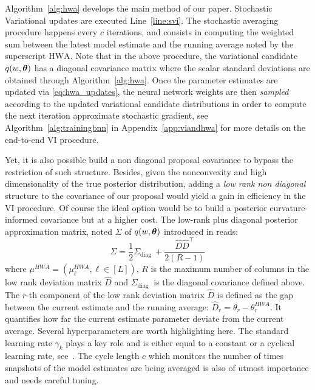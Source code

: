\documentclass[tablecaption=bottom,wcp]{jmlr} %
\begin{document}
Algorithm~\ref{alg:hwa} develops the main method of our paper.
Stochastic Variational updates are executed Line~\ref{line:svi}.
The stochastic averaging procedure happens every $c$ iterations, and consists in computing the weighted sum between the latest model estimate and the running average noted by the superscript $\textrm{HWA}$.
Note that in the above procedure, the variational candidate $q(w, \param)$ has a diagonal covariance matrix where the scalar standard deviations are obtained through Algorithm~\ref{alg:hwa}.
Once the parameter estimates are updated via \eqref{eq:hwa_updates}, the neural network weights are then \emph{sampled} according to the updated variational candidate distributions in order to compute the next iteration approximate stochastic gradient, see Algorithm~\ref{alg:trainingbnn} in Appendix~\ref{app:viandhwa} for more details on the end-to-end VI procedure.

Yet, it is also possible build a non diagonal proposal covariance to bypass the restriction of such structure.
Besides, given the nonconvexity and high dimensionality of the true posterior distribution, adding a \emph{low rank non diagonal} structure to the covariance of our proposal would yield a gain in efficiency in the VI procedure.
Of course the ideal option would be to build a posterior curvature-informed covariance but at a higher cost.
The low-rank plus diagonal posterior approximation matrix, noted $\Sigma$ of $q(w, \param)$ introduced in \citep{maddox2019simple} reads:
\begin{equation}\label{eq:lowrankcov}
\Sigma = \frac{1}{2} \Sigma_{\text {diag }}+\frac{\widehat{D} \widehat{D}^{\top}}{2(R-1)}
\end{equation}
where $\mu^{HWA} = (\mu_{\ell}^{HWA}, \ell \in [L])$, $R$ is the maximum number of columns in the low rank deviation matrix $\widehat{D}$ and $\Sigma_{\text {diag }}$ is the diagonal covariance defined above. 
The $r$-th component of the  low rank deviation matrix $\widehat{D}$ is defined as the gap between the current estimate and the running average: $\widehat{D}_r = \theta_r - \theta^{HWA}_r$. 
It quantifies how far the current estimate parameter deviate from the current average.
Several hyperparameters are worth highlighting here.
The standard learning rate $\gamma_k$ plays a key role and is either equal to a constant or a cyclical learning rate, see~\citep{zhang2019cyclical}.
The cycle length $c$ which monitors the number of times snapshots of the model estimates are being averaged is also of utmost importance and needs careful tuning.
\end{document}
